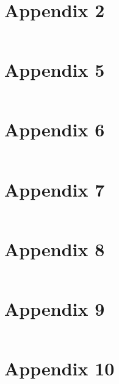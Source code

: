 \documentclass{article}
\begin{document}
\newpage
\section*{Appendix 2}
\inputminted{r}{q2.r}


\newpage
\section*{Appendix 5}
\inputminted{r}{q5.r}

\newpage
\section*{Appendix 6}
\inputminted{r}{q6.r}

\newpage
\section*{Appendix 7}
\inputminted{r}{q7.r}

\newpage
\section*{Appendix 8}
\inputminted{r}{q8.r}

\newpage
\section*{Appendix 9}
\inputminted{r}{q9.r}

\newpage
\section*{Appendix 10}
\inputminted{r}{q10.r}
\end{document}
